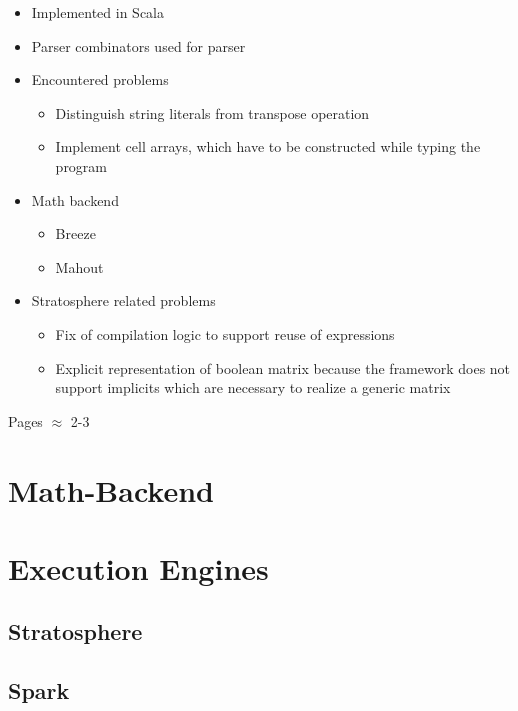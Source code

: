 \begin{itemize}
	\item Implemented in Scala
	\item Parser combinators used for parser
	\item Encountered problems
	\begin{itemize}
		\item Distinguish string literals from transpose operation
		\item Implement cell arrays, which have to be constructed while typing the program
	\end{itemize}
	\item Math backend
	\begin{itemize}
		\item Breeze
		\item Mahout
	\end{itemize}
	\item Stratosphere related problems
	\begin{itemize}
		\item Fix of compilation logic to support reuse of expressions
		\item Explicit representation of boolean matrix because the framework does not support implicits which are necessary to realize a generic matrix
	\end{itemize}
\end{itemize}

Pages $\approx$ 2-3

\section{Math-Backend}

\section{Execution Engines}

\subsection{Stratosphere}

\subsection{Spark}